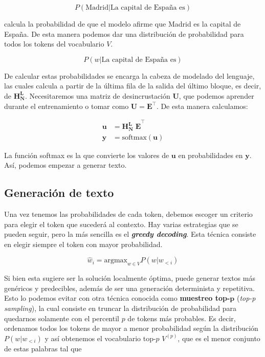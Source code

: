 \documentclass[12pt,twoside]{article}
\begin{document}
$$P(\text{Madrid}|\text{La capital de España es})$$

calcula la probabilidad de que el modelo afirme que Madrid es la capital de España. De esta manera podemos dar una distribución de probabilidad para todos los tokens del vocabulario $V$.

$$P(w|\text{La capital de España es})$$

De calcular estas probabilidades se encarga la cabeza de modelado del lenguaje, las cuales calcula a partir de la última fila de la salida del último bloque, es decir, de $\mathbf{H_N^{L}}$. Necesitaremos una matriz de desincrustación $\mathbf{U}$, que podemos aprender durante el entrenamiento o tomar como $\mathbf{U}=\mathbf{E}^\top$. De esta manera calculamos:

\begin{align}
    \mathbf{u} &= \mathbf{H_N^{L}\;E}^\top \\
    \mathbf{y} &= \text{softmax}(\mathbf{u})
    \label{eq:predicciones}
\end{align}

La función softmax es la que convierte los valores de $\mathbf{u}$ en probabilidades en $\mathbf{y}$. Así, podemos empezar a generar texto.

\subsection{Generación de texto}
Una vez tenemos las probabilidades de cada token, debemos escoger un criterio para elegir el token que sucederá al contexto. Hay varias estrategias que se pueden seguir, pero la más sencilla es el \textit{\textbf{greedy decoding}}. Esta técnica consiste en elegir siempre el token con mayor probabilidad.

\begin{equation}
    \hat{w}_i=\text{argmax}_{w\in V}P(w|w_{<i})
\end{equation}

Si bien esta sugiere ser la solución localmente óptima, puede generar textos más genéricos y predecibles, además de ser una generación determinista y repetitiva. Esto lo podemos evitar con otra técnica conocida como \textbf{muestreo top-}$\boldsymbol{p}$ (\textit{top-p sampling}), la cual consiste en truncar la distribución de probabilidad para quedarnos solamente con el percentil $p$ de tokens más probables. Es decir, ordenamos todos los tokens de mayor a menor probabilidad según la distribución $P(w|w_{<i})$ y así obtenemos el vocabulario top-$p$ $V^{(p)}$, que es el menor conjunto de estas palabras tal que
\end{document}
